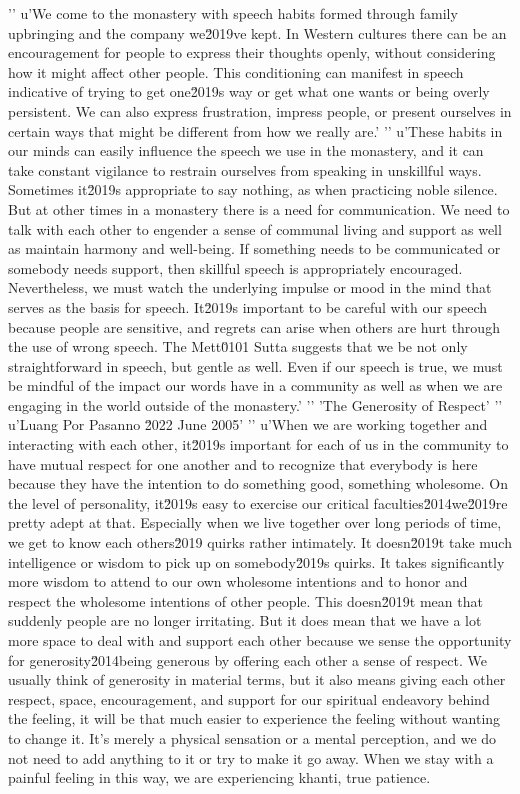 '\n'
u'We come to the monastery with speech habits formed through family upbringing and the company we\u2019ve kept. In Western cultures there can be an encouragement for people to express their thoughts openly, without considering how it might affect other people. This conditioning can manifest in speech indicative of trying to get one\u2019s way or get what one wants or being overly persistent. We can also express frustration, impress people, or present ourselves in certain ways that might be different from how we really are.'
'\n'
u'These habits in our minds can easily influence the speech we use in the monastery, and it can take constant vigilance to restrain ourselves from speaking in unskillful ways. Sometimes it\u2019s appropriate to say nothing, as when practicing noble silence. But at other times in a monastery there is a need for communication. We need to talk with each other to engender a sense of communal living and support as well as maintain harmony and well-being. If something needs to be communicated or somebody needs support, then skillful speech is appropriately encouraged. Nevertheless, we must watch the underlying impulse or mood in the mind that serves as the basis for speech. It\u2019s important to be careful with our speech because people are sensitive, and regrets can arise when others are hurt through the use of wrong speech. The Mett\u0101 Sutta suggests that we be not only straightforward in speech, but gentle as well. Even if our speech is true, we must be mindful of the impact our words have in a community as well as when we are engaging in the world outside of the monastery.'
'\n'
'The Generosity of Respect'
'\n'
u'Luang Por Pasanno \u2022 June 2005'
'\n'
u'When we are working together and interacting with each other, it\u2019s important for each of us in the community to have mutual respect for one another and to recognize that everybody is here because they have the intention to do something good, something wholesome. On the level of personality, it\u2019s easy to exercise our critical faculties\u2014we\u2019re pretty adept at that. Especially when we live together over long periods of time, we get to know each others\u2019 quirks rather intimately. It doesn\u2019t take much intelligence or wisdom to pick up on somebody\u2019s quirks. It takes significantly more wisdom to attend to our own wholesome intentions and to honor and respect the wholesome intentions of other people. This doesn\u2019t mean that suddenly people are no longer irritating. But it does mean that we have a lot more space to deal with and support each other because we sense the opportunity for generosity\u2014being generous by offering each other a sense of respect. We usually think of generosity in material terms, but it also means giving each other respect, space, encouragement, and support for our spiritual endeavory behind the feeling, it will be that much easier 
to experience the feeling without wanting to change it. It's merely a 
physical sensation or a mental perception, and we do not need to add 
anything to it or try to make it go away. When we stay with a painful 
feeling in this way, we are experiencing khanti, true patience.

